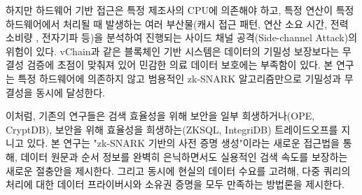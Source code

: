 \bigskip

하지만 하드웨어 기반 접근은 특정 제조사의 CPU에 의존해야 하고, 특정 연산이 특정 하드웨어에서 처리될 때 발생하는 여러 부산물(캐시 접근 패턴, 연산 소요 시간, 전력 소비량 , 전자기파 등)을 분석하여 진행되는 사이드 채널 공격(Side-channel Attack)의 위험이 있다. vChain과 같은 블록체인 기반 시스템은 데이터의 기밀성 보장보다는 무결성 검증에 초점이 맞춰져 있어 민감한 의료 데이터 보호에는 부족함이 있다. 본 연구는 특정 하드웨어에 의존하지 않고 범용적인 zk-SNARK 알고리즘만으로 기밀성과 무결성을 동시에 달성한다.

\bigskip

이처럼, 기존의 연구들은 검색 효율성을 위해 보안을 일부 희생하거나(OPE, CryptDB), 보안을 위해 효율성을 희생하는(ZKSQL, IntegriDB) 트레이드오프를 지니고 있다. 본 연구는 "zk-SNARK 기반의 사전 증명 생성"이라는 새로운 접근법을 통해, 데이터 원문과 순서 정보를 완벽히 은닉하면서도 실용적인 검색 속도를 보장하는 새로운 절충안을 제시한다. 그리고 동시에 현실의 데이터 수요를 고려해, 다중 쿼리의 처리에 대한 데이터 프라이버시와 소유권 증명을 모두 만족하는 방법론을 제시한다.
